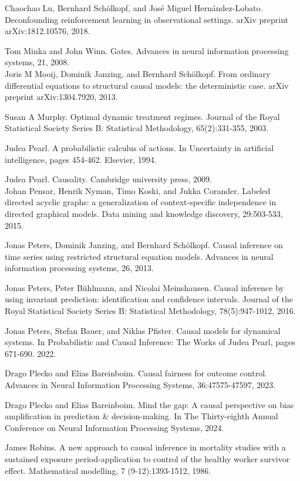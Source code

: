 \documentclass[10pt]{article}
\begin{document}
Chaochao Lu, Bernhard Schölkopf, and José Miguel Hernández-Lobato. Deconfounding reinforcement learning in observational settings. arXiv preprint arXiv:1812.10576, 2018.

Tom Minka and John Winn. Gates. Advances in neural information processing systems, 21, 2008.\\
Joris M Mooij, Dominik Janzing, and Bernhard Schölkopf. From ordinary differential equations to structural causal models: the deterministic case. arXiv preprint arXiv:1304.7920, 2013.

Susan A Murphy. Optimal dynamic treatment regimes. Journal of the Royal Statistical Society Series B: Statistical Methodology, 65(2):331-355, 2003.

Judea Pearl. A probabilistic calculus of actions. In Uncertainty in artificial intelligence, pages 454-462. Elsevier, 1994.

Judea Pearl. Causality. Cambridge university press, 2009.\\
Johan Pensar, Henrik Nyman, Timo Koski, and Jukka Corander. Labeled directed acyclic graphs: a generalization of context-specific independence in directed graphical models. Data mining and knowledge discovery, 29:503-533, 2015.

Jonas Peters, Dominik Janzing, and Bernhard Schölkopf. Causal inference on time series using restricted structural equation models. Advances in neural information processing systems, 26, 2013.

Jonas Peters, Peter Bühlmann, and Nicolai Meinshausen. Causal inference by using invariant prediction: identification and confidence intervals. Journal of the Royal Statistical Society Series B: Statistical Methodology, 78(5):947-1012, 2016.

Jonas Peters, Stefan Bauer, and Niklas Pfister. Causal models for dynamical systems. In Probabilistic and Causal Inference: The Works of Judea Pearl, pages 671-690. 2022.

Drago Plecko and Elias Bareinboim. Causal fairness for outcome control. Advances in Neural Information Processing Systems, 36:47575-47597, 2023.

Drago Plecko and Elias Bareinboim. Mind the gap: A causal perspective on bias amplification in prediction \& decision-making. In The Thirty-eighth Annual Conference on Neural Information Processing Systems, 2024.

James Robins. A new approach to causal inference in mortality studies with a sustained exposure period-application to control of the healthy worker survivor effect. Mathematical modelling, 7 (9-12):1393-1512, 1986.
\end{document}
